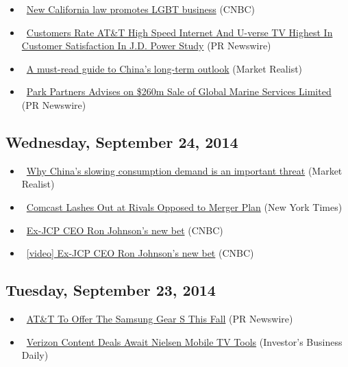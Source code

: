 \documentclass[11pt,asymmetric]{article}
\begin{document}
\begin{itemize}
\item\ \href{http://finance.yahoo.com/video/california-law-promotes-lgbt-business-140000150.html}{New California law promotes LGBT business} (CNBC)
\item\ \href{http://finance.yahoo.com/news/customers-rate-t-high-speed-132600703.html}{Customers Rate AT\&T High Speed Internet And U-verse TV Highest In Customer Satisfaction In J.D. Power Study} (PR Newswire)
\item\ \href{http://finance.yahoo.com/news/must-read-guide-china-long-130022758.html}{A must-read guide to China’s long-term outlook} (Market Realist)
\item\ \href{http://finance.yahoo.com/news/park-partners-advises-260m-sale-060000656.html}{Park Partners Advises on \$260m Sale of Global Marine Services Limited} (PR Newswire)
\end{itemize}
\subsection*{Wednesday, September 24, 2014}
\begin{itemize}
\item\ \href{http://finance.yahoo.com/news/why-china-slowing-consumption-demand-210212702.html}{Why China’s slowing consumption demand is an important threat} (Market Realist)
\item\ \href{http://www.nytimes.com/2014/09/25/business/media/comcast-accuses-rivals-of-extortion-in-opposing-its-bid-for-time-warner-cable.html?partner=yahoofinance}{Comcast Lashes Out at Rivals Opposed to Merger Plan} (New York Times)
\item\ \href{http://finance.yahoo.com/video/ex-jcp-ceo-ron-johnsons-155000456.html}{Ex-JCP CEO Ron Johnson's new bet} (CNBC)
\item\ \href{http://video.cnbc.com/gallery/?video=3000313458&__source=yahoo%7cheadline%7cquote%7cvideo%7c&par=yahoo}{[video] Ex-JCP CEO Ron Johnson's new bet} (CNBC)
\end{itemize}
\subsection*{Tuesday, September 23, 2014}
\begin{itemize}
\item\ \href{http://finance.yahoo.com/news/t-offer-samsung-gear-fall-024100706.html}{AT\&T To Offer The Samsung Gear S This Fall} (PR Newswire)
\item\ \href{http://news.investors.com/092314-718622-verizon-lte-multicast-technology-mobile-video.htm?ven=yahoocp&src=aurlled&ven=yahoo}{Verizon Content Deals Await Nielsen Mobile TV Tools} (Investor's Business Daily)
\end{itemize}
\end{document}
